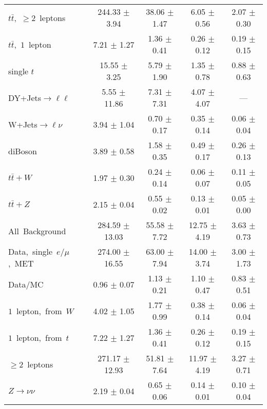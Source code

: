 \documentclass{article}
\begin{document}
\begin{longtable}{|l|c|c|c|c|}
$t\bar{t}$,~$\ge2$~leptons & 244.33 $\pm$ 3.94  & 38.06 $\pm$ 1.47  & 6.05 $\pm$ 0.56  & 2.07 $\pm$ 0.30 \\* 
$t\bar{t}$,~$1$~lepton & 7.21 $\pm$ 1.27  & 1.36 $\pm$ 0.41  & 0.26 $\pm$ 0.12  & 0.19 $\pm$ 0.15 \\* 
single $t$  & 15.55 $\pm$ 3.25  & 5.79 $\pm$ 1.90  & 1.35 $\pm$ 0.78  & 0.88 $\pm$ 0.63 \\* 
DY+Jets$\rightarrow\ell\ell$  & 5.55 $\pm$ 11.86  & 7.31 $\pm$ 7.31  & 4.07 $\pm$ 4.07  & --- \\* 
W+Jets$\rightarrow\ell\nu$  & 3.94 $\pm$ 1.04  & 0.70 $\pm$ 0.17  & 0.35 $\pm$ 0.14  & 0.06 $\pm$ 0.04 \\* 
diBoson  & 3.89 $\pm$ 0.58  & 1.58 $\pm$ 0.35  & 0.49 $\pm$ 0.17  & 0.26 $\pm$ 0.13 \\* 
$t\bar{t}+W$  & 1.97 $\pm$ 0.30  & 0.24 $\pm$ 0.14  & 0.06 $\pm$ 0.07  & 0.11 $\pm$ 0.05 \\* 
$t\bar{t}+Z$  & 2.15 $\pm$ 0.04  & 0.55 $\pm$ 0.02  & 0.13 $\pm$ 0.01  & 0.05 $\pm$ 0.00 \\* 
\hline \hline 
All~Background  & 284.59 $\pm$ 13.03  & 55.58 $\pm$ 7.72  & 12.75 $\pm$ 4.19  & 3.63 $\pm$ 0.73 \\* 
Data,~single~$e/\mu$,~MET  & 274.00 $\pm$ 16.55  & 63.00 $\pm$ 7.94  & 14.00 $\pm$ 3.74  & 3.00 $\pm$ 1.73 \\* 
Data/MC  & 0.96 $\pm$ 0.07  & 1.13 $\pm$ 0.21  & 1.10 $\pm$ 0.47  & 0.83 $\pm$ 0.51 \\* 
\hline \hline 
$1$~lepton,~from~$W$  & 4.02 $\pm$ 1.05  & 1.77 $\pm$ 0.99  & 0.38 $\pm$ 0.14  & 0.06 $\pm$ 0.04 \\* 
$1$~lepton,~from~$t$  & 7.22 $\pm$ 1.27  & 1.36 $\pm$ 0.41  & 0.26 $\pm$ 0.12  & 0.19 $\pm$ 0.15 \\* 
$\ge2$~leptons  & 271.17 $\pm$ 12.93  & 51.81 $\pm$ 7.64  & 11.97 $\pm$ 4.19  & 3.27 $\pm$ 0.71 \\* 
$Z\rightarrow\nu\nu$  & 2.19 $\pm$ 0.04  & 0.65 $\pm$ 0.06  & 0.14 $\pm$ 0.01  & 0.10 $\pm$ 0.04 \\* 
\hline 
\end{longtable} 

 
 
 
 
\pagebreak 

 
 
 
 
\end{document}
